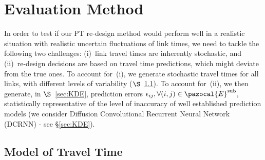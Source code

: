 \documentclass[a4paper,fleqn]{cas-sc}
\begin{document}


\section{Evaluation Method}\label{sec:evaMETHO}
%
In order to test if our  PT re-design method would perform well in a realistic situation with realistic uncertain fluctuations of link times, we need to tackle the following two challenges: (i)~link travel times are inherently stochastic, and (ii)~re-design decisions are based on travel time predictions, which might deviate from the true ones. To account for~(i), we generate stochastic travel times for all links, with different levels of variability ($\S$~\ref{sec:log_normal}). To account for~(ii), we then generate, in $\S$~\ref{sec:KDE}, prediction errors $\epsilon_{ij}, \forall (i,j) \in \pazocal{E}^{\text{sub}}$, statistically representative of the level of inaccuracy of well established prediction models (we consider Diffusion Convolutional Recurrent Neural Network (DCRNN) - see \S{}\ref{sec:KDE}). 

\subsection{Model of Travel Time}
\label{sec:log_normal}
\end{document}
